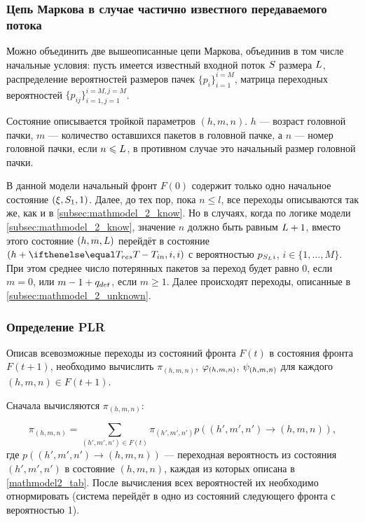 \subsubsection{Цепь Маркова в случае частично известного передаваемого потока}
\label{subsec:mathmodel_2_mixed}

Можно объединить две вышеописанные цепи Маркова, объединив в том числе начальные условия: пусть имеется известный входной поток $S$ размера $L$, распределение вероятностей размеров пачек $\{ p_i \}_{i=1}^{i=M}$, матрица переходных вероятностей $\{ p_{ij} \}_{i=1, j=1}^{i=M, j=M}$.

Состояние описывается тройкой параметров $(h, m, n)$.
$h$ --- возраст головной пачки, $m$ --- количество оставшихся пакетов в головной пачке, а $n$ --- номер головной пачки, если $n \leqslant L$, в противном случае это начальный размер головной пачки.

В данной модели начальный фронт $F(0)$ содержит только одно начальное состояние $(\xi, S_1, 1)$. Далее, до тех пор, пока $n \leq l$, все переходы описываются так же, как и в \ref{subsec:mathmodel_2_know}. Но в случаях, когда по логике модели \ref{subsec:mathmodel_2_know}, значение $n$ должно быть равным $L + 1$, вместо этого состояние $(h, m, L)$ перейдёт в состояние $(h + \Tres - \Tin, i, i)$ с вероятностью $p_{S_L i}$, $i \in \{ 1, \ldots, M \}$. При этом среднее число потерянных пакетов за переход будет равно 0, если $m = 0$, или $m - 1 + q_{det}$, если $m \geq 1$.
Далее происходят переходы, описанные в \ref{subsec:mathmodel_2_unknown}.

\subsubsection{Определение PLR}

Описав всевозможные переходы из состояний фронта $F(t)$ в состояния фронта $F(t+1)$, необходимо вычислить $\pi_{(h, m, n)}$, $\varphi_{(h, m, n)}$, $\psi_{(h, m, n)}$ для каждого $(h, m, n) \in F(t+1)$.

Сначала вычисляются $\pi_{(h, m, n)}$:

\begin{equation*}
\pi_{(h, m, n)} = \sum\limits_{(h', m', n') \in F(t)} \pi_{(h', m', n')} p\left( (h', m', n') \to (h, m, n) \right),
\end{equation*}
где $p\left( (h', m', n') \to (h, m, n) \right)$ --- переходная вероятность из состояния $(h', m', n')$ в состояние $(h, m, n)$, каждая из которых описана в \ref{mathmodel2_tab}. После вычисления всех вероятностей их необходимо отнормировать (система перейдёт в одно из состояний следующего фронта с вероятностью 1).

